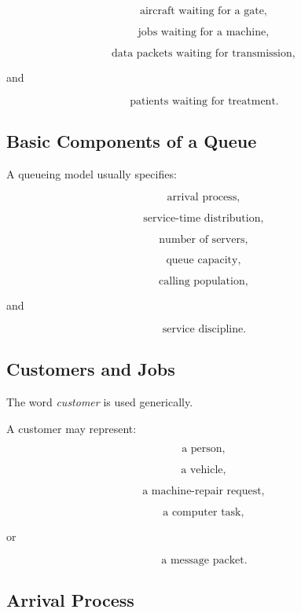 \[
\boxed{
\text{aircraft waiting for a gate},
}
\]

\[
\boxed{
\text{jobs waiting for a machine},
}
\]

\[
\boxed{
\text{data packets waiting for transmission},
}
\]

and

\[
\boxed{
\text{patients waiting for treatment}.
}
\]

\subsection{Basic Components of a Queue}
\label{subsec:basic-components-queue}

A queueing model usually specifies:

\[
\boxed{
\text{arrival process},
}
\]

\[
\boxed{
\text{service-time distribution},
}
\]

\[
\boxed{
\text{number of servers},
}
\]

\[
\boxed{
\text{queue capacity},
}
\]

\[
\boxed{
\text{calling population},
}
\]

and

\[
\boxed{
\text{service discipline}.
}
\]

\subsection{Customers and Jobs}
\label{subsec:queue-customers-jobs}

The word \emph{customer} is used generically.

A customer may represent:

\[
\boxed{
\text{a person},
}
\]

\[
\boxed{
\text{a vehicle},
}
\]

\[
\boxed{
\text{a machine-repair request},
}
\]

\[
\boxed{
\text{a computer task},
}
\]

or

\[
\boxed{
\text{a message packet}.
}
\]

\subsection{Arrival Process}
\label{subsec:queue-arrival-process}

